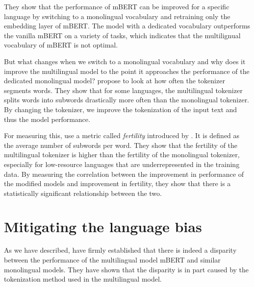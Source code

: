 They show that the performance of mBERT can be improved for a specific language by switching to a monolingual vocabulary and retraining only the embedding layer of mBERT. The model with a dedicated vocabulary outperforms the vanilla mBERT on a variety of tasks, which indicates that the multilignual vocabulary of mBERT is not optimal. 

But what changes when we switch to a monolingual vocabulary and why does it improve the multilingual model to the point it approaches the performance of the dedicated monolingual model? \citet{rust_how_2021} propose to look at how often the tokenizer segments words. They show that for some languages, the multilingual tokenizer splits words into subwords drastically more often than the monolingual tokenizer. By changing the tokenizer, we improve the tokenization of the input text and thus the model performance.

For measuring this, \citet{rust_how_2021} use a metric called \textit{fertility} introduced by \citet{acs_exploring_2019}. It is defined as the average number of subwords per word. They show that the fertility of the multilingual tokenizer is higher than the fertility of the monolingual tokenizer, especially for low-resource languages that are underrepresented in the training data. By measuring the correlation between the improvement in performance of the modified models and improvement in fertility, they show that there is a statistically significant relationship between the two.


\section{Mitigating the language bias}

As we have described, \citet{rust_how_2021} have firmly established that there is indeed a disparity between the performance of the multilingual model mBERT and similar monolingual models. They have shown that the disparity is in part caused by the tokenization method used in the multilingual model.

